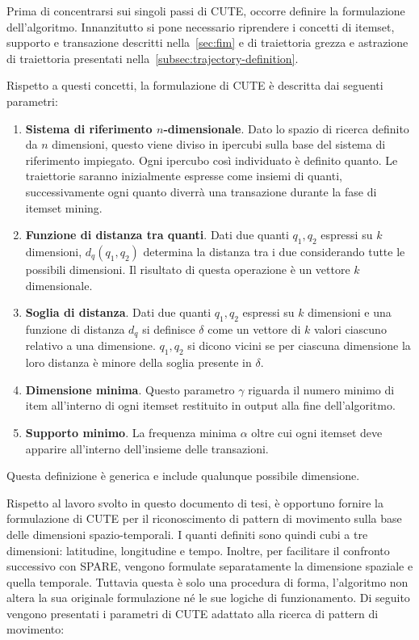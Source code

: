 Prima di concentrarsi sui singoli passi di CUTE, occorre definire la formulazione dell'algoritmo.
Innanzitutto si pone necessario riprendere i concetti di itemset, supporto e transazione descritti nella~\cref{sec:fim}
e di traiettoria grezza e astrazione di traiettoria presentati nella~\cref{subsec:trajectory-definition}.

Rispetto a questi concetti, la formulazione di CUTE è descritta dai seguenti parametri:

\begin{enumerate}

  \item \textbf{Sistema di riferimento \(n\)-dimensionale}.
  Dato lo spazio di ricerca definito da \(n\) dimensioni, questo viene diviso in ipercubi sulla base del sistema di riferimento impiegato.
  Ogni ipercubo così individuato è definito quanto.
  Le traiettorie saranno inizialmente espresse come insiemi di quanti, successivamente ogni quanto diverrà una transazione durante la fase di itemset mining.
  
  \item \textbf{Funzione di distanza tra quanti}.
  Dati due quanti \(q_{1}, q_{2}\) espressi su \(k\) dimensioni, \(d_q(q_{1}, q_{2})\) determina la distanza tra i due considerando tutte le possibili dimensioni.
  Il risultato di questa operazione è un vettore \(k\) dimensionale.
  
  \item \textbf{Soglia di distanza}.
   Dati due quanti \(q_{1}, q_{2}\)  espressi su \(k\) dimensioni e una funzione di distanza \(d_q\) si definisce \(\delta\) come un vettore di \(k\) valori ciascuno relativo a una dimensione.
   \(q_{1}, q_{2}\) si dicono vicini se per ciascuna dimensione la loro distanza è minore della soglia presente in \(\delta\).
   
  \item \textbf{Dimensione minima}. Questo parametro \(\gamma \) riguarda il numero minimo di item all'interno di ogni itemset restituito in output alla fine dell'algoritmo.
  
  \item \textbf{Supporto minimo}. La frequenza minima \(\alpha \) oltre cui ogni itemset deve apparire all'interno dell'insieme delle transazioni.

\end{enumerate}

Questa definizione è generica e include qualunque possibile dimensione.

Rispetto al lavoro svolto in questo documento di tesi, è opportuno fornire la formulazione di CUTE per il riconoscimento di pattern di movimento sulla base delle dimensioni spazio-temporali.
I quanti definiti sono quindi cubi a tre dimensioni: latitudine, longitudine e tempo.
Inoltre, per facilitare il confronto successivo con SPARE, vengono formulate separatamente la dimensione spaziale e quella temporale.
Tuttavia questa è solo una procedura di forma, l'algoritmo non altera la sua originale formulazione né le sue logiche di funzionamento.
Di seguito vengono presentati i parametri di CUTE adattato alla ricerca di pattern di movimento:

